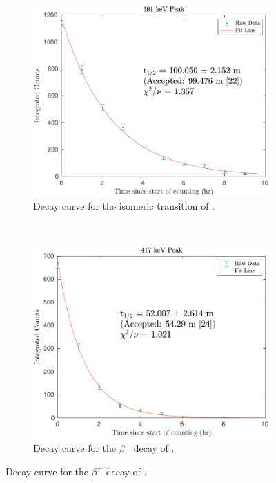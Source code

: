 \documentclass[5p]{elsarticle}
\begin{document}
\begin{figure}
\begin{subfigure}[t]{0.49\textwidth}
        \includegraphics[scale=0.6]{./figures/391keV_curve_new.pdf}
        \caption{ Decay curve for the isomeric transition of .}
        \label{fig:decay_curve_391}
    \end{subfigure}%
    \\
    \begin{subfigure}[t]{0.49\textwidth}
        \centering
        \includegraphics[scale=0.6]{./figures/417keV_curve_new.pdf}
        \caption{Decay curve for the $\beta^-$ decay of .}
                \label{fig:decay_curve_417}

\end{subfigure}
\end{figure}
\end{document}
